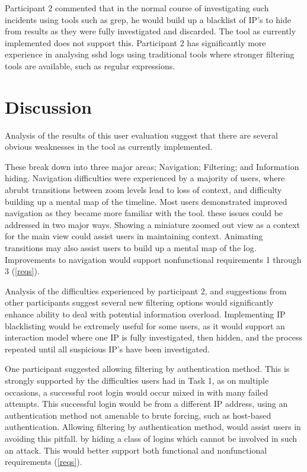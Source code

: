 Participant 2 commented that in the normal course of investigating such incidents using tools such as grep, he would build up a blacklist of IP's to hide from results as they were fully investigated and discarded.
The tool as currently implemented does not support this. Participant 2 has significantly more experience in analysing sshd logs using traditional tools where stronger filtering tools are available, such as regular expressions. 

\section{Discussion} 

Analysis of the results of this user evaluation suggest that there are several obvious weaknesses in the tool as currently implemented. 

These break down into three major areas; Navigation; Filtering; and Information hiding.
Navigation difficulties were experienced by a majority of users, where abrubt transitions between zoom levels lead to loss of context, and difficulty building up a mental map of the timeline. 
Most users demonstrated improved navigation as they became more familiar with the tool. these issues could be addressed in two major ways. Showing a miniature zoomed out view as a context for the main view could assist users in maintaining context. 
Animating transitions may also assist users to build up a mental map of the log. Improvements to navigation would support nonfunctional requirements 1 through 3 (\ref{reqs}). 

Analysis of the difficulties experienced by participant 2, and suggestions from other participants suggest several new filtering options would significantly enhance ability to deal with potential information overload. 
Implementing IP blacklisting would be extremely useful for some users, as it would support an interaction model where one IP is fully investigated, then hidden, and the process repeated until all suspicious IP's have been investigated. 

One participant suggested allowing filtering by authentication method. This is strongly supported by the difficulties users had in Task 1, as on multiple occasions, a successful root login would occur mixed in with many failed attempts. This successful login would be from a different IP address, using an authentication method not amenable to brute forcing, such as host-based authentication. Allowing filtering by authentication method, would assist users in avoiding this pitfall. by hiding a class of logins which cannot be involved in such an attack. This would better support both functional and nonfunctional requirements (\ref{reqs}).

